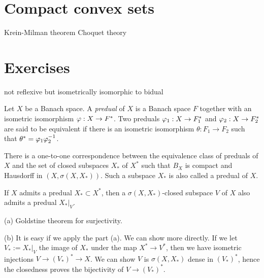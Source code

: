 \documentclass{../../large}
\begin{document}
\section{Compact convex sets}
Krein-Milman theorem
Choquet theory






\section*{Exercises}
\begin{prb}
not reflexive but isometrically isomorphic to bidual
\end{prb}

\begin{prb}[Preduals]
Let $X$ be a Banach space.
A \emph{predual} of $X$ is a Banach space $F$ together with an isometric isomorphism $\varphi:X\to F^*$.
Two preduals $\varphi_1:X\to F_1^*$ and $\varphi_2:X\to F_2^*$ are said to be equivalent if there is an isometric isomorphism $\theta:F_1\to F_2$ such that $\theta^*=\varphi_1\varphi_2^{-1}$.
\begin{parts}
\item There is a one-to-one correspondence between the equivalence class of preduals of $X$ and the set of closed subspaces $X_*$ of $X^*$ such that $B_X$ is compact and Hausdorff in $(X,\sigma(X,X_*))$.
Such a subspace $X_*$ is also called a predual of $X$.
\item If $X$ admits a predual $X_*\subset X^*$, then a $\sigma(X,X_*)$-closed subspace $V$ of $X$ also admits a predual $X_*|_V$.
\end{parts}
\end{prb}
\begin{pf}
(a) Goldstine theorem for surjectivity.

(b)
It is easy if we apply the part (a).
We can show more directly.
If we let $V_*:=X_*|_V$ the image of $X_*$ under the map $X^*\to V^*$, then we have isometric injections $V\to(V_*)^*\to X$.
We can show $V$ is $\sigma(X,X_*)$ dense in $(V_*)^*$, hence the closedness proves the bijectivity of $V\to(V_*)^*$.
\end{pf}

\begin{prb}

\end{prb}
\end{document}
